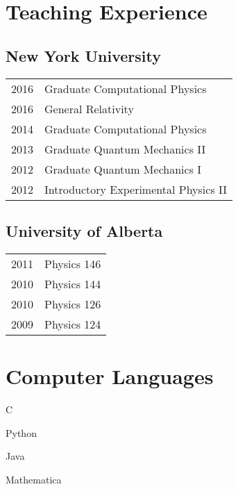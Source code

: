 \documentclass[letterpaper]{article}
\def\footerlink{}
\renewenvironment{itemize}{
  \begin{list}{}{
    \setlength{\leftmargin}{1.5em}
  }
}{
  \end{list}
}
\begin{document}
\section*{Teaching Experience}
\subsection*{New York University}
\begin{itemize}
\item \begin{tabular}{ll}
2016 & Graduate Computational Physics \\
2016 & General Relativity \\
2014 & Graduate Computational Physics \\
2013 & Graduate Quantum Mechanics II \\
2012 & Graduate Quantum Mechanics I \\
2012 & Introductory Experimental Physics II \\
\end{tabular}
\end{itemize}
\subsection*{University of Alberta}
\begin{itemize}
\item \begin{tabular}{ll}
2011 & Physics 146 \\
2010 & Physics 144 \\
2010 & Physics 126 \\
2009 & Physics 124 \\
\end{tabular}
\end{itemize}

\section*{Computer Languages}
\begin{itemize}
\item C
\item Python
\item Java
\item Mathematica
\end{itemize}



\bigskip

\end{document}
